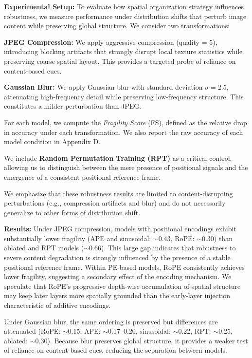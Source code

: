 \documentclass{article}
\begin{document}
    \textbf{Experimental Setup:}
    To evaluate how spatial organization strategy influences robustness, we measure performance under distribution shifts that perturb image content while preserving global structure. We consider two transformations:

    \textbf{JPEG Compression:} We apply aggressive compression (quality = 5), introducing blocking artifacts that strongly disrupt local texture statistics while preserving coarse spatial layout. This provides a targeted probe of reliance on content-based cues.

    \textbf{Gaussian Blur:} We apply Gaussian blur with standard deviation $\sigma = 2.5$, attenuating high-frequency detail while preserving low-frequency structure. This constitutes a milder perturbation than JPEG.

    For each model, we compute the \emph{Fragility Score} (FS), defined as the relative drop in accuracy under each transformation. We also report the raw accuracy of each model condition in Appendix D.

    We include \textbf{Random Permutation Training (RPT)} as a critical control, allowing us to distinguish between the mere presence of positional signals and the emergence of a consistent positional reference frame.

    We emphasize that these robustness results are limited to content-disrupting perturbations (e.g., compression artifacts and blur) and do not necessarily generalize to other forms of distribution shift.
    
    \textbf{Results:}
    Under JPEG compression, models with positional encodings exhibit substantially lower fragility (APE and sinusoidal: $\sim$0.43, RoPE: $\sim$0.30) than ablated and RPT models ($\sim$0.66). This large gap indicates that robustness to severe content degradation is strongly influenced by the presence of a stable positional reference frame. Within PE-based models, RoPE consistently achieves lower fragility, suggesting a secondary effect of the encoding mechanism. We speculate that RoPE's progressive depth-wise accumulation of spatial structure may keep later layers more spatially grounded than the early-layer injection characteristic of additive encodings.

    Under Gaussian blur, the same ordering is preserved but differences are attenuated (RoPE: $\sim$0.15, APE: $\sim$0.17--0.20, sinusoidal: $\sim$0.22, RPT: $\sim$0.25, ablated: $\sim$0.30). Because blur preserves global structure, it provides a weaker test of reliance on content-based cues, reducing the separation between models.
\end{document}

